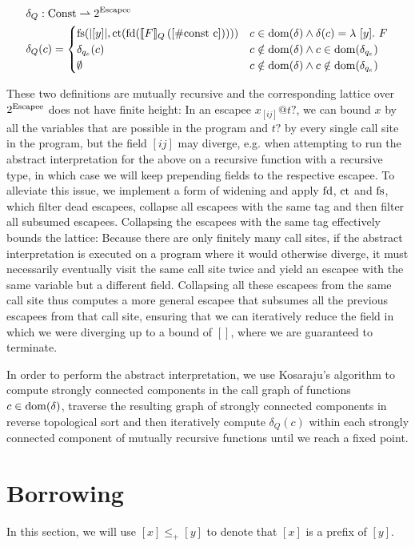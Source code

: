 \begin{align*}
	\delta_Q &: \mathrlap{\Const \rightharpoonup 2^{\Escapee}} \\
	\delta_Q&(c) = \begin{cases}
		\fs(|[y]|, \ct(\fd(\ecp{F}{[\#\text{const c}]}))) & c \in \dom(\delta) \land \delta(c) = \lambda\ [y].\ F \\
		\delta_{q_e}(c) & c \notin \dom(\delta) \land c \in \dom(\delta_{q_e}) \\
		\emptyset & c \notin \dom(\delta) \land c \notin \dom(\delta_{q_e})
	\end{cases}
\end{align*}

These two definitions are mutually recursive and the corresponding lattice over $2^{\mathrm{Escapee}}$ does not have finite height: In an escapee $x_{[ij]} @ t?$, we can bound $x$ by all the variables that are possible in the program and $t?$ by every single call site in the program, but the field $[ij]$ may diverge, e.g. when attempting to run the abstract interpretation for the above on a recursive function with a recursive type, in which case we will keep prepending fields to the respective escapee. To alleviate this issue, we implement a form of widening and apply $\mathrm{fd}$, $\mathrm{ct}$ and $\mathrm{fs}$, which filter dead escapees, collapse all escapees with the same tag and then filter all subsumed escapees. Collapsing the escapees with the same tag effectively bounds the lattice: Because there are only finitely many call sites, if the abstract interpretation is executed on a program where it would otherwise diverge, it must necessarily eventually visit the same call site twice and yield an escapee with the same variable but a different field. Collapsing all these escapees from the same call site thus computes a more general escapee that subsumes all the previous escapees from that call site, ensuring that we can iteratively reduce the field in which we were diverging up to a bound of $[]$, where we are guaranteed to terminate.

In order to perform the abstract interpretation, we use Kosaraju's algorithm to compute strongly connected components in the call graph of functions $c \in \mathrm{dom}(\delta)$, traverse the resulting graph of strongly connected components in reverse topological sort and then iteratively compute $\delta_Q(c)$ within each strongly connected component of mutually recursive functions until we reach a fixed point.

\section{Borrowing}
In this section, we will use $[x] \leq_+ [y]$ to denote that $[x]$ is a prefix of $[y]$.

